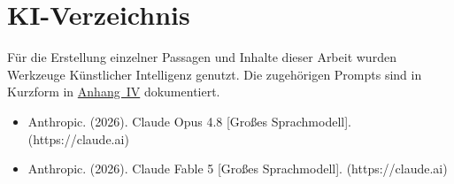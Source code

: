 \cleardoublepage
\chapter*{KI-Verzeichnis}

Für die Erstellung einzelner Passagen und Inhalte dieser Arbeit wurden Werkzeuge Künstlicher Intelligenz genutzt. Die zugehörigen Prompts sind in Kurzform in \hyperref[anh:prompts]{Anhang~IV} dokumentiert.

\begin{itemize}
    \setlength{\itemsep}{0.2em}
    \setlength{\parsep}{0pt}
    \setlength{\parskip}{0pt}
    \item Anthropic. (2026). Claude Opus 4.8 [Großes Sprachmodell]. (https://claude.ai)
    \item Anthropic. (2026). Claude Fable 5 [Großes Sprachmodell]. (https://claude.ai)
\end{itemize}